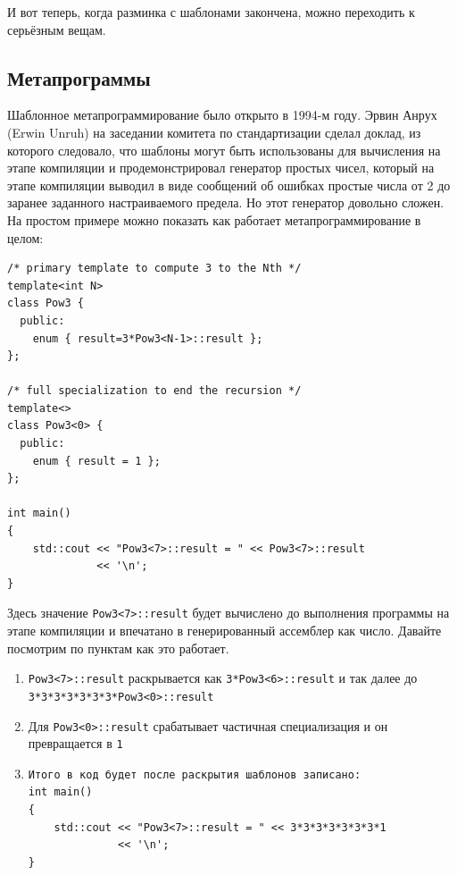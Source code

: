 \documentclass[a4paper,12pt,oneside]{article}
\begin{document}
И вот теперь, когда разминка с шаблонами закончена, можно переходить к серьёзным вещам.

\subsection{Метапрограммы}

Шаблонное метапрограммирование было открыто в 1994-м году. Эрвин Анрух (Erwin Unruh) на заседании комитета по стандартизации сделал доклад, из которого следовало, что шаблоны могут быть использованы для вычисления на этапе компиляции и продемонстрировал генератор простых чисел, который на этапе компиляции выводил в виде сообщений об ошибках простые числа от 2 до заранее заданного настраиваемого предела. Но этот генератор довольно сложен. На простом примере можно показать как работает метапрограммирование в целом:

\begin{lstlisting}
/* primary template to compute 3 to the Nth */
template<int N> 
class Pow3 { 
  public: 
    enum { result=3*Pow3<N-1>::result }; 
}; 

/* full specialization to end the recursion */
template<> 
class Pow3<0> { 
  public: 
    enum { result = 1 }; 
}; 

int main() 
{ 
    std::cout << "Pow3<7>::result = " << Pow3<7>::result 
              << '\n'; 
} 
\end{lstlisting}

Здесь значение \lstinline!Pow3<7>::result! будет вычислено до выполнения программы на этапе компиляции и впечатано в генерированный ассемблер как число. Давайте посмотрим по пунктам как это работает.

\begin{enumerate}
\item
\lstinline!Pow3<7>::result! раскрывается как \lstinline!3*Pow3<6>::result! и так далее до \lstinline!3*3*3*3*3*3*3*Pow3<0>::result!
\item
Для \lstinline!Pow3<0>::result! срабатывает частичная специализация и он превращается в \lstinline!1!
\item
\begin{lstlisting}
Итого в код будет после раскрытия шаблонов записано:
int main() 
{ 
    std::cout << "Pow3<7>::result = " << 3*3*3*3*3*3*3*1                                         
              << '\n'; 
} 
\end{lstlisting}
\end{enumerate}
\end{document}
